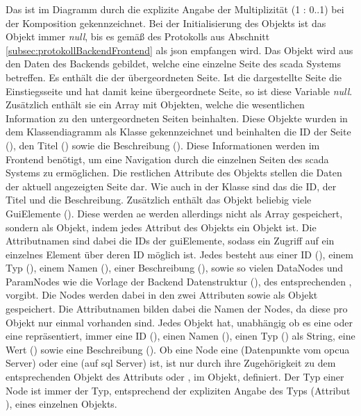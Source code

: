 Das ist im Diagramm durch die explizite Angabe der Multiplizität (1 : 0..1) bei der Komposition gekennzeichnet.
Bei der Initialisierung des  Objekts ist das  Objekt immer \emph{null}, 
bis es gemäß des Protokolls aus Abschnitt \ref{subsec:protokollBackendFrontend} als \ac{json} empfangen wird.
Das  Objekt wird aus den Daten des Backends gebildet, welche eine einzelne Seite des \ac{scada} Systems betreffen.
Es enthält die  der übergeordneten Seite. 
Ist die dargestellte Seite die Einstiegsseite und hat damit keine übergeordnete Seite, so ist diese Variable \emph{null}.
Zusätzlich enthält sie ein Array mit Objekten, welche die wesentlichen Information zu den untergeordneten Seiten beinhalten.
Diese Objekte wurden in dem Klassendiagramm als  Klasse gekennzeichnet und beinhalten die ID der Seite (), 
den Titel () sowie die Beschreibung ().
Diese Informationen werden im Frontend benötigt, um eine Navigation durch die einzelnen Seiten des \ac{scada} Systems zu ermöglichen.
Die restlichen Attribute des  Objekts stellen die Daten der aktuell angezeigten Seite dar.
Wie auch in der  Klasse sind das die ID, der Titel und die Beschreibung.
Zusätzlich enthält das  Objekt beliebig viele GuiElemente (). 
Diese werden ae werden allerdings nicht als Array gespeichert, sondern als Objekt, indem jedes Attribut des Objekts ein  Objekt ist.
Die Attributnamen sind dabei die IDs der guiElemente, sodass ein Zugriff auf ein einzelnes Element über deren ID möglich ist.
Jedes  besteht aus einer ID (), einem Typ (), einem Namen (), 
einer Beschreibung (), sowie so vielen DataNodes und ParamNodes wie die Vorlage der Backend Datenstruktur (), des entsprechenden , vorgibt.
Die Nodes werden dabei in den zwei Attributen  sowie  als Objekt gespeichert. Die Attributnamen bilden dabei die Namen der Nodes, da diese pro  Objekt nur einmal vorhanden sind. 
Jedes  Objekt hat, unabhängig ob es eine  oder eine  repräsentiert, 
immer eine ID (), einen Namen (), einen Typ () als String, eine Wert () sowie eine Beschreibung ().
Ob eine Node eine  (Datenpunkte vom \ac{opcua} Server) oder eine  (auf \ac{sql} Server) ist, ist nur durch ihre Zugehörigkeit zu dem entsprechenden Objekt des Attributs  oder , im  Objekt, definiert.
Der Typ einer Node ist immer der Typ, entsprechend der expliziten Angabe des Typs (Attribut ), eines einzelnen  Objekts.